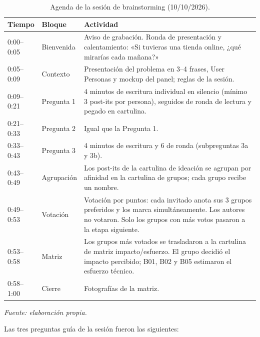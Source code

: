 \begin{table}[ht]
\centering
\caption{Agenda de la sesión de brainstorming (10/10/2026).}
\label{tab:brainstorming-agenda}
\begin{tabular}{p{2cm} p{3cm} p{8cm}}
\hline
\textbf{Tiempo} & \textbf{Bloque} & \textbf{Actividad} \\
\hline
0:00--0:05 & Bienvenida & Aviso de grabación. Ronda de presentación y calentamiento: «Si tuvieras una tienda online, ¿qué mirarías cada mañana?» \\
0:05--0:09 & Contexto & Presentación del problema en 3--4 frases, User Personas y mockup del panel; reglas de la sesión. \\
0:09--0:21 & Pregunta 1 & 4 minutos de escritura individual en silencio (mínimo 3 post-its por persona), seguidos de ronda de lectura y pegado en cartulina. \\
0:21--0:33 & Pregunta 2 & Igual que la Pregunta 1. \\
0:33--0:43 & Pregunta 3 & 4 minutos de escritura y 6 de ronda (subpreguntas 3a y 3b). \\
0:43--0:49 & Agrupación & Los post-its de la cartulina de ideación se agrupan por afinidad en la cartulina de grupos; cada grupo recibe un nombre. \\
0:49--0:53 & Votación & Votación por puntos: cada invitado anota sus 3 grupos preferidos y los marca simultáneamente. Los autores no votaron. Solo los grupos con más votos pasaron a la etapa siguiente. \\
0:53--0:58 & Matriz & Los grupos más votados se trasladaron a la cartulina de matriz impacto/esfuerzo. El grupo decidió el impacto percibido; B01, B02 y B05 estimaron el esfuerzo técnico. \\
0:58--1:00 & Cierre & Fotografías de la matriz. \\
\hline
\end{tabular}
\smallskip
\noindent\textit{Fuente: elaboración propia.}
\end{table}

\FloatBarrier

Las tres preguntas guía de la sesión fueron las siguientes:

